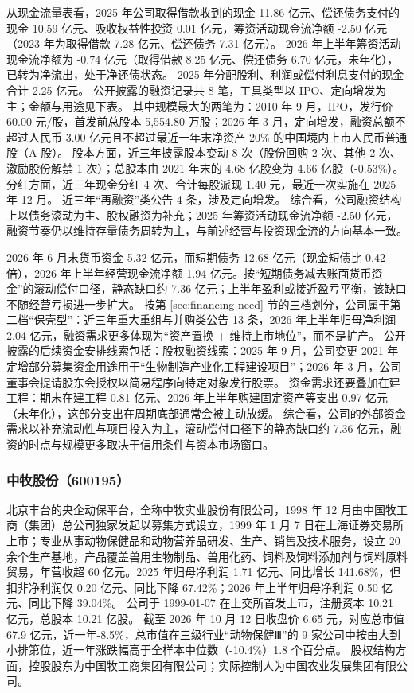  从现金流量表看，2025 年公司取得借款收到的现金 11.86 亿元、偿还债务支付的现金 10.59 亿元、吸收权益性投资 0.01 亿元，筹资活动现金流净额 -2.50 亿元（2023 年为取得借款 7.28 亿元、偿还债务 7.31 亿元）。 2026 年上半年筹资活动现金流净额为 -0.74 亿元（取得借款 8.25 亿元、偿还债务 6.70 亿元，未年化），已转为净流出，处于净还债状态。 2025 年分配股利、利润或偿付利息支付的现金合计 2.25 亿元。 公开披露的融资记录共 8 笔，工具类型以 IPO、定向增发为主；金额与用途见下表。 其中规模最大的两笔为：2010 年 9 月，IPO，发行价 60.00 元/股，首发前总股本 5,554.80 万股；2026 年 3 月，定向增发，融资总额不超过人民币 3.00 亿元且不超过最近一年末净资产 20\% 的中国境内上市人民币普通股（A 股）。 股本方面，近三年披露股本变动 8 次（股份回购 2 次、其他 2 次、激励股份解禁 1 次）；总股本由 2021 年末的 4.68 亿股变为 4.66 亿股（-0.53\%）。 分红方面，近三年现金分红 4 次、合计每股派现 1.40 元，最近一次实施在 2025 年 12 月。 近三年“再融资”类公告 4 条，涉及定向增发。 综合看，公司融资结构上以债务滚动为主、股权融资为补充；2025 年筹资活动现金流净额 -2.50 亿元，融资节奏仍以维持存量债务周转为主，与前述经营与投资现金流的方向基本一致。

 2026 年 6 月末货币资金 5.32 亿元，而短期债务 12.68 亿元（现金短债比 0.42 倍），2026 年上半年经营现金流净额 1.94 亿元。按“短期债务减去账面货币资金”的滚动偿付口径，静态缺口约 7.36 亿元；上半年盈利或接近盈亏平衡，该缺口不随经营亏损进一步扩大。 按第 \ref{sec:financing-need} 节的三档划分，公司属于第二档“保壳型”：近三年重大重组与并购类公告 13 条，2026 年上半年归母净利润 2.04 亿元，融资需求更多体现为“资产置换 + 维持上市地位”，而不是扩产。 公开披露的后续资金安排线索包括：股权融资线索：2025 年 9 月，公司变更 2021 年定增部分募集资金用途用于“生物制造产业化工程建设项目”；2026 年 3 月，公司董事会提请股东会授权以简易程序向特定对象发行股票。 资金需求还要叠加在建工程：期末在建工程 0.81 亿元、2026 年上半年购建固定资产等支出 0.97 亿元（未年化），这部分支出在周期底部通常会被主动放缓。 综合看，公司的外部资金需求以补充流动性与项目投入为主，滚动偿付口径下的静态缺口约 7.36 亿元，融资的时点与规模更多取决于信用条件与资本市场窗口。




\subsubsection{中牧股份（600195）}
\label{co:600195}

 北京丰台的央企动保平台，全称中牧实业股份有限公司，1998 年 12 月由中国牧工商（集团）总公司独家发起以募集方式设立，1999 年 1 月 7 日在上海证券交易所上市；专业从事动物保健品和动物营养品研发、生产、销售及技术服务，设立 20 余个生产基地，产品覆盖兽用生物制品、兽用化药、饲料及饲料添加剂与饲料原料贸易，年营收超 60 亿元。2025 年归母净利润 1.71 亿元、同比增长 141.68\%，但扣非净利润仅 0.20 亿元、同比下降 67.42\%；2026 年上半年归母净利润 0.50 亿元、同比下降 39.04\%。 公司于 1999-01-07 在上交所首发上市，注册资本 10.21 亿元，总股本 10.21 亿股。 截至 2026 年 10 月 12 日收盘价 6.65 元，对应总市值 67.9 亿元，近一年-8.5\%，总市值在三级行业“动物保健Ⅲ”的 9 家公司中按由大到小排第位，近一年涨跌幅高于全样本中位数（-10.4\%）1.8 个百分点。 股权结构方面，控股股东为中国牧工商集团有限公司；实际控制人为中国农业发展集团有限公司。

